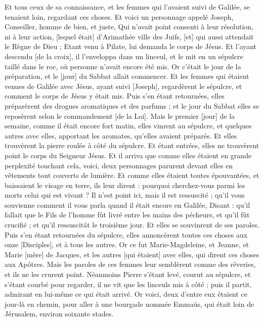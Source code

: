 \begin{multicols}{2}
Et tous ceux de sa connaissance, et les femmes qui l'avaient suivi de Galilée, se tenaient loin, regardant ces choses.
Et voici un personnage appelé Joseph, Conseiller, homme de bien, et juste,
Qui n'avait point consenti à leur résolution, ni à leur action, [lequel était] d'Arimathée ville des Juifs, [et] qui aussi attendait le Règne de Dieu ;
Etant venu à Pilate, lui demanda le corps de Jésus.
Et l'ayant descendu [de la croix], il l'enveloppa dans un linceul, et le mit en un sépulcre taillé dans le roc, où personne n'avait encore été mis.
Or c'était le jour de la préparation, et le [jour] du Sabbat allait commencer.
Et les femmes qui étaient venues de Galilée avec Jésus, ayant suivi [Joseph], regardèrent le sépulcre, et comment le corps de Jésus y était mis.
Puis s'en étant retournées, elles préparèrent des drogues aromatiques et des parfums ; et le jour du Sabbat elles se reposèrent selon le commandement [de la Loi].
\VerseOne{}Mais le premier [jour] de la semaine, comme il était encore fort matin, elles vinrent au sépulcre, et quelques autres avec elles, apportant les aromates, qu'elles avaient préparés.
Et elles trouvèrent la pierre roulée à côté du sépulcre.
Et étant entrées, elles ne trouvèrent point le corps du Seigneur Jésus.
Et il arriva que comme elles étaient en grande perplexité touchant cela, voici, deux personnages parurent devant elles en vêtements tout couverts de lumière.
Et comme elles étaient toutes épouvantées, et baissaient le visage en terre, ils leur dirent : pourquoi cherchez-vous parmi les morts celui qui est vivant ?
Il n'est point ici, mais il est ressuscité ; qu'il vous souvienne comment il vous parla quand il était encore en Galilée,
Disant : qu'il fallait que le Fils de l'homme fût livré entre les mains des pécheurs, et qu'il fût crucifié ; et qu'il ressuscitât le troisième jour.
Et elles se souvinrent de ses paroles.
Puis s'en étant retournées du sépulcre, elles annoncèrent toutes ces choses aux onze [Disciples], et à tous les autres.
Or ce fut Marie-Magdeleine, et Jeanne, et Marie [mère] de Jacques, et les autres [qui étaient] avec elles, qui dirent ces choses aux Apôtres.
Mais les paroles de ces femmes leur semblèrent comme des rêveries, et ils ne les crurent point.
Néanmoins Pierre s'étant levé, courut au sépulcre, et s'étant courbé pour regarder, il ne vit que les linceuls mis à côté ; puis il partit, admirant en lui-même ce qui était arrivé.
Or voici, deux d'entre eux étaient ce jour-là en chemin, pour aller à une bourgade nommée Emmaüs, qui était loin de Jérusalem, environ soixante stades.

\end{multicols}
